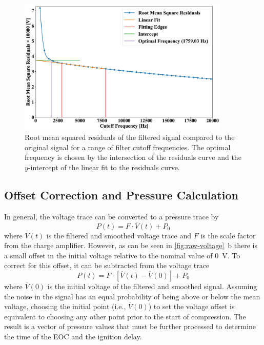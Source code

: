 \documentclass[12pt]{../ussci}
\begin{document}
\begin{figure}[htbp]
\centering
\includegraphics[width=0.9\textwidth]{figures/residuals.png}
\caption{Root mean squared residuals of the filtered signal compared to the
original signal for a range of filter cutoff frequencies. The optimal frequency
is chosen by the intersection of the residuals curve and the $y$-intercept of
the linear fit to the residuals curve.}
\label{fig:residuals}
\end{figure}

\subsection{Offset Correction and Pressure Calculation}\label{offset-correction-and-pressure-calculation}

In general, the voltage trace can be converted to a pressure trace by
%
\begin{equation}
    P(t) = F \cdot \overline{V}(t) + P_0
\end{equation}
%
where \(\overline{V}(t)\) is the filtered and smoothed voltage trace and
\(F\) is the scale factor from the charge amplifier. However, as can be
seen in \cref{fig:raw-voltage}~b there is a small offset
in the initial voltage relative to the nominal value of \SI{0}{\V}. To correct
for this offset, it can be subtracted from the voltage trace
%
\begin{equation}
    P(t) = F \cdot \left[\overline{V}(t) - \overline{V}(0)\right] + P_0
\end{equation}
%
where \(\overline{V}(0)\) is the initial voltage of the filtered and
smoothed signal. Assuming the noise in the signal has an equal
probability of being above or below the mean voltage, choosing the
initial point (i.e., \(\overline{V}(0)\)) to set the voltage offset is
equivalent to choosing any other point prior to the start of
compression. The result is a vector of pressure values that must be
further processed to determine the time of the EOC and the ignition
delay.
\end{document}
